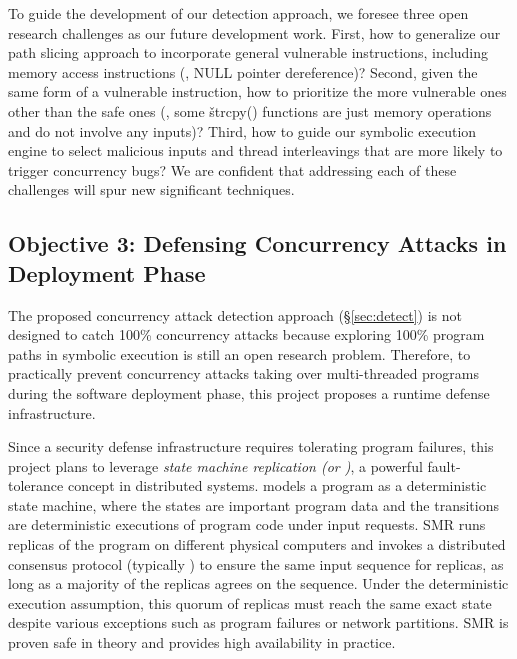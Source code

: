  To guide the development of our detection 
approach, we foresee three open research challenges as our future development 
work. First, how to generalize our path slicing approach to incorporate general 
vulnerable instructions, including memory access instructions (\eg, NULL pointer 
dereference)? Second, given the same form of a vulnerable instruction, how to 
prioritize the more vulnerable ones other than the safe ones (\eg, some 
\v{strcpy()} functions are just memory operations and do not involve any 
inputs)? Third, how to guide our symbolic execution engine to select malicious 
inputs and thread interleavings that are more likely to trigger concurrency 
bugs? We are confident that addressing each of these challenges will spur new 
significant techniques.

\vspace{-.15in}\subsection{Objective 3: Defensing Concurrency Attacks 
in Deployment Phase}\label{sec:defense}\vspace{-.075in}

The proposed concurrency attack detection approach (\S\ref{sec:detect}) is not 
designed to catch 100\% concurrency attacks because exploring 100\% program 
paths in symbolic execution is still an open research problem. Therefore, to 
practically prevent concurrency attacks taking over multi-threaded programs 
during the software deployment phase, this project proposes a runtime defense 
infrastructure.

Since a security defense infrastructure requires tolerating program failures, 
this project plans to leverage \emph{state machine replication (or \smr)}, a 
powerful fault-tolerance concept in distributed systems. \smr 
models a program as a deterministic state machine, where the states are 
important program data and the transitions are deterministic executions of 
program code under input requests. SMR runs replicas of the program on 
different physical computers and invokes a distributed consensus protocol 
(typically \paxos) to ensure the same input sequence for replicas, 
as long as a majority of the replicas agrees on the sequence. 
Under the deterministic execution assumption, this quorum of replicas must reach 
the same exact state despite various exceptions such as program failures or 
network partitions. SMR is proven safe in theory and provides high availability 
in practice.



